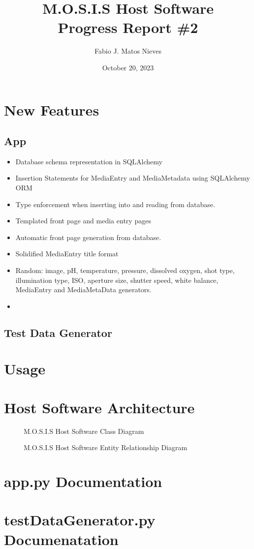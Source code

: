 \documentclass[12pt]{article}
\author{Fabio J. Matos Nieves}
\date{October 20, 2023}
\title{M.O.S.I.S Host Software\\Progress Report \#2}
\begin{document}

\tableofcontents
\newpage
\section{New Features}
\subsection{App}
\begin{itemize}
\item Database schema representation in SQLAlchemy
\item Insertion Statements for MediaEntry and MediaMetadata using SQLAlchemy ORM
\item Type enforcement when inserting into and reading from database.
\item Templated front page and media entry pages
\item Automatic front page generation from database.
\item Solidified MediaEntry title format
\item Random: image, pH, temperature, pressure, dissolved oxygen, shot type, illumination type, ISO, aperture size, shutter speed, white balance, MediaEntry and MediaMetaData generators.
 \item  
\end{itemize}
\subsection{Test Data Generator}
\section{Usage}
\appendix
\section{Host Software Architecture}
\begin{figure}[H]
  \caption{M.O.S.I.S Host Software Class Diagram}
\end{figure}
\begin{figure}[H]
  \caption{M.O.S.I.S Host Software Entity Relationship Diagram}
\end{figure}
\section{app.py Documentation}

\section{testDataGenerator.py Documenatation}

\end{document}
